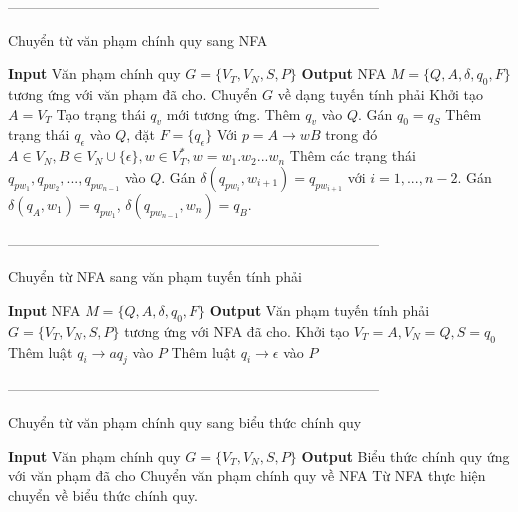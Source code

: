 \documentclass[14pt]{extreport}
\begin{document}
--------------------------------------------------------------------------------\\
\begin{algorithm}[H]
\caption{Chuyển từ văn phạm chính quy sang NFA}
\begin{algorithmic} 
\STATE \textbf{Input} Văn phạm chính quy $G = \{V_T, V_N, S, P\}$
\STATE \textbf{Output} NFA $M = \{Q, A, \delta, q_0, F\}$ tương ứng với văn phạm đã cho.
\STATE Chuyển $G$ về dạng tuyến tính phải
\ENDIF
\STATE Khởi tạo $A = V_T$
\STATE Tạo trạng thái $q_{v}$ mới tương ứng.
\STATE Thêm $q_{v}$ vào $Q$.
\ENDFOR
\STATE Gán $q_0 = q_S$
\STATE Thêm trạng thái $q_\epsilon$ vào $Q$, đặt $F = \{q_\epsilon\}$
\STATE Với $p = A \rightarrow wB$ trong đó $A \in V_N, B \in V_N \cup \{\epsilon\}, w \in V_T^*, w = w_1.w_2...w_n$
\STATE Thêm các trạng thái $q_{pw_1}, q_{pw_2}, ..., q_{pw_{n-1}}$ vào $Q$.
\STATE Gán $\delta(q_{pw_i}, w_{i+1}) = q_{pw_{i+1}}$ với $i=1,...,n-2$.
\STATE Gán $\delta(q_A, w_1) = q_{pw_1}$, $\delta(q_{pw_{n-1}}, w_n) = q_B$.
\ENDFOR
\end{algorithmic}
\end{algorithm}

--------------------------------------------------------------------------------\\
\begin{algorithm}[H]
\caption{Chuyển từ NFA sang văn phạm tuyến tính phải}
\begin{algorithmic} 
\STATE \textbf{Input} NFA $M = \{Q, A, \delta, q_0, F\}$
\STATE \textbf{Output} Văn phạm tuyến tính phải $G = \{V_T, V_N, S, P\}$ tương ứng với NFA đã cho.
\STATE Khởi tạo $V_T = A, V_N = Q, S = q_0$
\STATE Thêm luật $q_i \rightarrow aq_j$ vào $P$
\ENDFOR
\ENDFOR
\ENDFOR
{}
\STATE Thêm luật $q_i \rightarrow \epsilon$ vào $P$
\ENDFOR
\end{algorithmic}
\end{algorithm}

--------------------------------------------------------------------------------\\
\begin{algorithm}[H]
\caption{Chuyển từ văn phạm chính quy sang biểu thức chính quy}
\begin{algorithmic} 
\STATE \textbf{Input} Văn phạm chính quy $G = \{V_T, V_N, S, P\}$
\STATE \textbf{Output} Biểu thức chính quy ứng với văn phạm đã cho
\STATE Chuyển văn phạm chính quy về NFA
\STATE Từ NFA thực hiện chuyển về biểu thức chính quy.
\end{algorithmic}
\end{algorithm}
\end{document}
